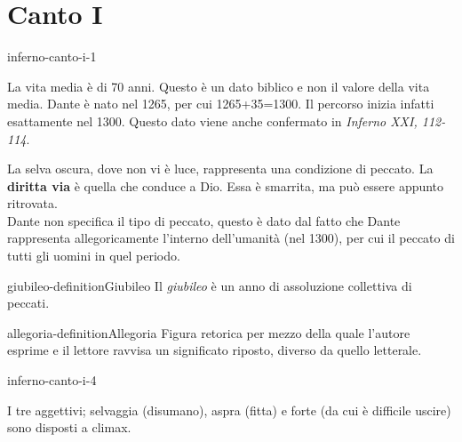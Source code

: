 \documentclass[preview]{standalone}
\begin{document}
\genpage

\section{Canto I}


\begin{snippet}{inferno-canto-i-1}

    La vita media è di 70 anni. Questo è un dato biblico e non il valore della vita media.
    Dante è nato nel 1265, per cui 1265+35=1300. Il percorso inizia infatti esattamente nel 1300.
    Questo dato viene anche confermato in \textit{Inferno XXI, 112-114}.

    La selva oscura, dove non vi è luce, rappresenta una condizione di peccato.
    La \textbf{diritta via} è quella che conduce a Dio.
    Essa è smarrita, ma può essere appunto ritrovata.
    \\
    Dante non specifica il tipo di peccato, questo è dato dal fatto che Dante rappresenta allegoricamente
    l'interno dell'umanità (nel 1300), per cui il peccato di tutti gli uomini in quel periodo.
\end{snippet}

\begin{snippetdefinition}{giubileo-definition}{Giubileo}
    Il \textit{giubileo} è un anno di assoluzione collettiva di peccati.
\end{snippetdefinition}


\begin{snippetdefinition}{allegoria-definition}{Allegoria}
    Figura retorica per mezzo della quale l'autore esprime e il lettore ravvisa un significato riposto,
    diverso da quello letterale.
\end{snippetdefinition}

\begin{snippet}{inferno-canto-i-4}

    I tre aggettivi; selvaggia (disumano), aspra (fitta) e forte (da cui è difficile uscire)
    sono disposti a climax.
\end{snippet}
\end{document}
